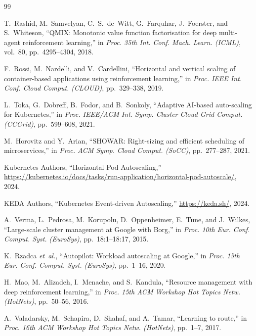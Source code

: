 \documentclass[conference]{IEEEtran}
\begin{document}
\begin{thebibliography}{99}

T.~Rashid, M.~Samvelyan, C.~S.~de~Witt, G.~Farquhar, J.~Foerster,
and S.~Whiteson,
``QMIX: Monotonic value function factorisation for deep multi-agent
reinforcement learning,''
in \textit{Proc. 35th Int. Conf. Mach. Learn. (ICML)},
vol.~80, pp.~4295--4304, 2018.

F.~Rossi, M.~Nardelli, and V.~Cardellini,
``Horizontal and vertical scaling of container-based applications
using reinforcement learning,''
in \textit{Proc. IEEE Int. Conf. Cloud Comput. (CLOUD)},
pp.~329--338, 2019.

L.~Toka, G.~Dobreff, B.~Fodor, and B.~Sonkoly,
``Adaptive AI-based auto-scaling for Kubernetes,''
in \textit{Proc. IEEE/ACM Int. Symp. Cluster Cloud Grid Comput.
(CCGrid)}, pp.~599--608, 2021.

M.~Horovitz and Y.~Arian,
``SHOWAR: Right-sizing and efficient scheduling of microservices,''
in \textit{Proc. ACM Symp. Cloud Comput. (SoCC)},
pp.~277--287, 2021.

Kubernetes Authors,
``Horizontal Pod Autoscaling,''
\url{https://kubernetes.io/docs/tasks/run-application/horizontal-pod-autoscale/},
2024.

KEDA Authors,
``Kubernetes Event-driven Autoscaling,''
\url{https://keda.sh/}, 2024.

A.~Verma, L.~Pedrosa, M.~Korupolu, D.~Oppenheimer, E.~Tune,
and J.~Wilkes,
``Large-scale cluster management at Google with Borg,''
in \textit{Proc. 10th Eur. Conf. Comput. Syst. (EuroSys)},
pp.~18:1--18:17, 2015.

K.~Rzadca \textit{et~al.},
``Autopilot: Workload autoscaling at Google,''
in \textit{Proc. 15th Eur. Conf. Comput. Syst. (EuroSys)},
pp.~1--16, 2020.

H.~Mao, M.~Alizadeh, I.~Menache, and S.~Kandula,
``Resource management with deep reinforcement learning,''
in \textit{Proc. 15th ACM Workshop Hot Topics Netw. (HotNets)},
pp.~50--56, 2016.

A.~Valadarsky, M.~Schapira, D.~Shahaf, and A.~Tamar,
``Learning to route,''
in \textit{Proc. 16th ACM Workshop Hot Topics Netw. (HotNets)},
pp.~1--7, 2017.


\end{thebibliography}
\end{document}
